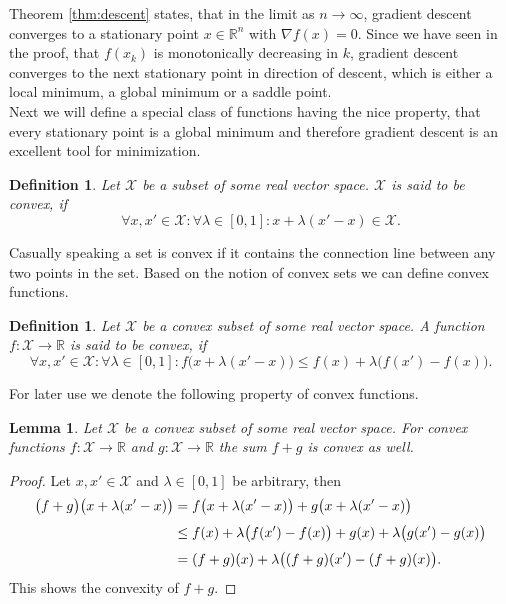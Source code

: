 \documentclass[11pt, a4paper]{article}
\newtheorem{lemma}[theorem]{Lemma}
\newtheorem{definition}[theorem]{Definition}
\newcommand{\R}{\mathbb{R}}
\newcommand{\X}{\mathcal{X}}
\begin{document}
Theorem \ref{thm:descent} states, that in the limit as $n \to \infty$, gradient descent converges to a stationary point $x \in \R^n$ with $\nabla f(x) = 0$. Since we have seen in the proof, that $f(x_k)$ is monotonically decreasing in $k$, gradient descent converges to the next stationary point in direction of descent, which is either a local minimum, a global minimum or a saddle point. \\

Next we will define a special class of functions having the nice property, that every stationary point is a global minimum and therefore gradient descent is an excellent tool for minimization.

\begin{definition}
Let $\X$ be a subset of some real vector space. $\X$ is said to be convex, if 
\[ \forall x, x' \in \X : \forall \lambda \in [0,1] : x + \lambda (x' - x) \in \X. \]
\end{definition}

Casually speaking a set is convex if it contains the connection line between any two points in the set. Based on the notion of convex sets we can define convex functions.

\begin{definition}
Let $\X$ be a convex subset of some real vector space. A function $f: \X \to \R$ is said to be convex, if
\[ \forall x,x' \in \X : \forall \lambda \in [0,1] : f \big (x + \lambda (x'-x) \big ) \leq f(x) + \lambda \big ( f(x') - f(x) \big ). \]
\end{definition}

For later use we denote the following property of convex functions.

\begin{lemma} \label{lem:convexity}
Let $\X$ be a convex subset of some real vector space. For convex functions $f: \X \to \R$ and $g: \X \to \R$ the sum $f+g$ is convex as well.
\end{lemma}

\begin{proof}
Let $x,x' \in \X$ and $\lambda \in [0,1]$ be arbitrary, then
\[ \begin{split}
\big ( f+g \big ) \big (x + \lambda (x'-x) \big ) 
&= f \big ( x + \lambda (x'-x) \big ) + g \big (x + \lambda (x'-x) \big ) \\\
\textcolor{white}{\Big |} &\leq f(x) + \lambda \big ( f(x') - f(x) \big ) + g(x) + \lambda \big ( g(x') - g(x) \big ) \\\
&= ( f + g )(x) + \lambda \big ( (f + g)(x') - (f+g)(x) \big ).
\end{split} \]
This shows the convexity of $f+g$.
\end{proof}
\end{document}
